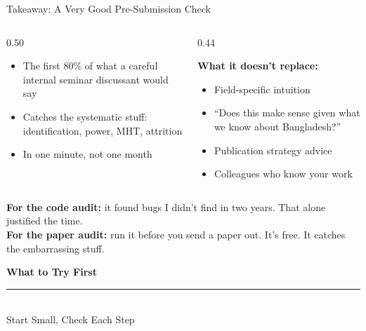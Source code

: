 \documentclass[aspectratio=169, 10pt]{beamer}
\begin{document}
\begin{frame}{Takeaway: A Very Good Pre-Submission Check}
\begin{columns}[T]
\begin{column}{0.50\textwidth}
\begin{tcolorbox}[keybox, title={\faCheck\quad What It Replaces}]
\small
\begin{itemize}\setlength{\itemsep}{3pt}
  \item The first 80\% of what a careful internal seminar discussant would say
  \item Catches the systematic stuff: identification, power, MHT, attrition
  \item In one minute, not one month
\end{itemize}
\end{tcolorbox}
\end{column}
\begin{column}{0.44\textwidth}
\begin{tcolorbox}[colback=SoftCoral!8, colframe=SoftCoral, boxrule=0.5pt, arc=3pt,
  left=6pt, right=6pt, top=4pt, bottom=4pt]
\small
\textbf{What it doesn't replace:}
\vskip3pt
\begin{itemize}\setlength{\itemsep}{2pt}
  \item Field-specific intuition
  \item ``Does this make sense given what we know about Bangladesh?''
  \item Publication strategy advice
  \item Colleagues who know your work
\end{itemize}
\end{tcolorbox}
\end{column}
\end{columns}
\vskip8pt
\begin{tcolorbox}[quotebox, width=13cm]
\small \textbf{For the code audit:} it found bugs I didn't find in two years. That alone justified the time.\\[2pt]
\textbf{For the paper audit:} run it before you send a paper out. It's free. It catches the embarrassing stuff.
\end{tcolorbox}
\end{frame}

{
\begin{frame}
\centering\vfill
{\fontsize{22}{28}\bfseries\selectfont\color{white} What to Try First}\\[6pt]
{\color{UVMGold}\rule{5cm}{0.8pt}}\\[6pt]
{\normalsize\color{UVMGold} Start Small, Check Each Step}
\vfill
\end{frame}
}
\end{document}
